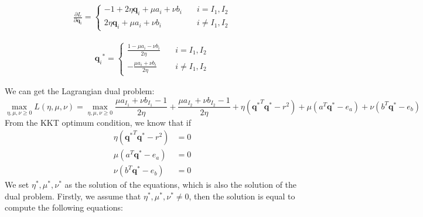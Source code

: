 \documentclass[twoside]{article}
\theoremstyle{plain}
\newcommand{\tranT}{T}
\renewcommand{\vec}[1]{\bm{#1}}
\begin{document}
 \begin{equation}
\begin{split} 
\frac{\partial L}{\partial \vec{q}_i} = \left\{
\begin{aligned}
-1 + 2\eta \vec{q}_i +\mu a_i + \nu b_i \quad& i = I_1, I_2\\
 2\eta \vec{q}_i +\mu a_i + \nu b_i \quad& i \neq I_1, I_2
\end{aligned}
\right.
 \end{split}
\label{eq:lang1}
\end{equation}

 \begin{equation}
\begin{split} 
{\vec{q}_i}^{*} = \left\{
\begin{aligned}
\frac{1- \mu a_i - \nu b_i}{2\eta} \quad& i = I_1, I_2\\
-\frac{\mu a_i + \nu b_i}{2\eta} \quad& i \neq I_1, I_2
\end{aligned}
\right.
 \end{split}
\label{eq:lang1}
\end{equation}

We can get the Lagrangian dual problem:
\begin{equation}
\max_{\eta,\mu,\nu\geq0} L(\eta,\mu,\nu) = \max_{\eta,\mu,\nu\geq0} \frac{\mu a_{I_1} + \nu b_{I_1}-1}{2\eta} +\frac{\mu a_{I_2} + \nu b_{I_2}-1}{2\eta}+ \eta({\vec{q}^{*}}^{\tranT}\vec{q}^{*}-r^2 )+\mu( a^{\tranT}\vec{q}^{*} - e_a ) + \nu( b^{\tranT}\vec{q}^{*} - e_b )
\end{equation}
From the KKT optimum condition, we know that if
\begin{equation}
\begin{split} 
 \eta ({\vec{q}^{*}}^{\tranT}\vec{q}^{*} -r^2) &= 0\\
 \mu( a^{\tranT}\vec{q}^{*} - e_a)&= 0\\
 \nu(b^{\tranT}\vec{q}^{*} - e_b) &=0
 \end{split}
\end{equation}
We set $\eta^{*}, \mu^{*}, \nu^{*}$ as the solution of the equations, which is also the solution of the dual problem. Firstly, we assume that $\eta^{*}, \mu^{*}, \nu^{*} \neq 0$, then the solution is equal to compute the following equations:
\end{document}
